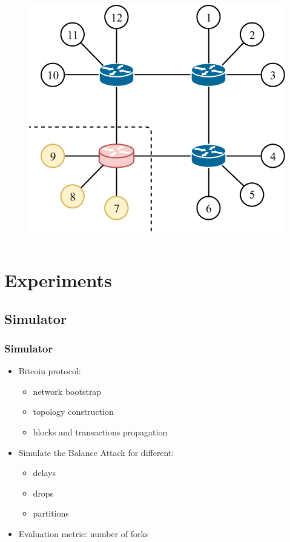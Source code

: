 \documentclass[pdf]{beamer}
\begin{document}
\begin{frame}
\begin{columns}
\begin{figure}
\begin{overprint}
				\includegraphics[scale=0.5]{figures/balance}
			\end{overprint}
		\end{figure}
	\end{columns}
\end{frame}

\section{Experiments}
\subsection*{Simulator}
\begin{frame}
	\frametitle{Simulator}
	\begin{itemize}
		\setlength \itemsep{1.5em}
		\item Bitcoin protocol:
		      \begin{itemize}
		      	\setlength \itemsep{0.5em}
		      	\item network bootstrap
		      	\item topology construction
		      	\item blocks and transactions propagation
		      \end{itemize}
		\item Simulate the Balance Attack for different:
		      \begin{itemize}
		      	\setlength \itemsep{0.5em}
		      	\item delays
		      	\item drops
		      	\item partitions
			  \end{itemize}
		\item Evaluation metric: number of forks
	\end{itemize}
\end{frame}
\end{document}
